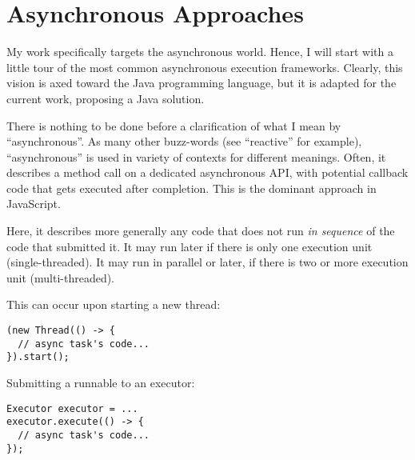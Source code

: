
\chapter{Asynchronous Approaches}
\label{ch:asyncworld}


My work specifically targets the asynchronous world. Hence, I will start with a little tour of the most common asynchronous execution frameworks. Clearly, this vision is axed toward the Java programming language, but it is adapted for the current work, proposing a Java solution.

There is nothing to be done before a clarification of what I mean by ``asynchronous''. As many other buzz-words (see ``reactive'' for example), ``asynchronous'' is used in variety of contexts for different meanings. Often, it describes a method call on a dedicated asynchronous API, with potential callback code that gets executed after completion. This is the dominant approach in JavaScript.

Here, it describes more generally any code that does not run \emph{in sequence} of the code that submitted it. It may run later if there is only one execution unit (single-threaded). It may run in parallel or later, if there is two or more execution unit (multi-threaded).

This can occur upon starting a new thread:

\begin{lstlisting}
(new Thread(() -> {
  // async task's code...
}).start();
\end{lstlisting}

Submitting a runnable to an executor:

\begin{lstlisting}
Executor executor = ...
executor.execute(() -> {
  // async task's code...
});
\end{lstlisting}

